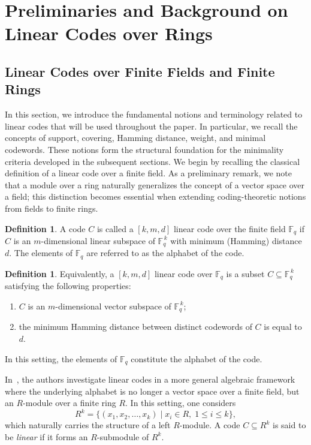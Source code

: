 \documentclass[10pt]{article}
\theoremstyle{definition}
\newtheorem{definition}[lem]{Definition}
\begin{document}
\section{Preliminaries and Background on Linear Codes over Rings} \label{preliminaries}

\subsection{Linear Codes over Finite Fields and Finite Rings}

In this section, we introduce the fundamental notions and terminology related to linear codes that will be used throughout the paper. In particular, we recall the concepts of support, covering, Hamming distance, weight, and minimal codewords. These notions form the structural foundation for the minimality criteria developed in the subsequent sections. We begin by recalling the classical definition of a linear code over a finite field. As a preliminary remark, we note that a module over a ring naturally generalizes the concept of a vector space over a field; this distinction becomes essential when extending coding-theoretic notions from fields to finite rings.


\begin{definition}\cite{RaymondHill}
A code $C$ is called a $[k,m,d]$ linear code over the finite field $\mathbb{F}_q$ if $C$ is an $m$-dimensional linear subspace of $\mathbb{F}_q^{\,k}$ with minimum (Hamming) distance $d$. The elements of $\mathbb{F}_q$ are referred to as the alphabet of the code.
\end{definition}

\begin{definition}\cite{RaymondHill}
Equivalently, a $[k,m,d]$ linear code over $\mathbb{F}_q$ is a subset $C \subseteq \mathbb{F}_q^{\,k}$ satisfying the following properties:
\begin{enumerate}
    \item $C$ is an $m$-dimensional vector subspace of $\mathbb{F}_q^{\,k}$;
    \item the minimum Hamming distance between distinct codewords of $C$ is equal to $d$.
\end{enumerate}
In this setting, the elements of $\mathbb{F}_q$ constitute the alphabet of the code.
\end{definition}



In~\cite{MajiMesnager}, the authors investigate linear codes in a more general algebraic framework where the underlying alphabet is no longer a vector space over a finite field, but an $R$-module over a finite ring $R$. In this setting, one considers
\[
R^k = \{ (x_1, x_2, \dots, x_k) \mid x_i \in R,\; 1 \le i \le k \},
\]
which naturally carries the structure of a left $R$-module. A code $C \subseteq R^k$ is said to be \emph{linear} if it forms an $R$-submodule of $R^k$.
\end{document}
